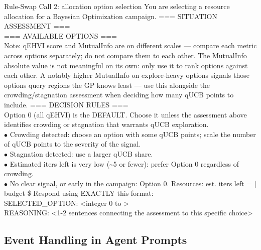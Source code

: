 \begin{fragmentbox}{Rule-Swap Call 2: allocation option selection}
\promptfont
You are selecting a resource allocation for a Bayesian Optimization campaign.
\vspace{0.35em}
=== SITUATION ASSESSMENT ===\\
\vspace{0.35em}
=== AVAILABLE OPTIONS ===\\
\vspace{0.35em}
Note: qEHVI score and MutualInfo are on different scales --- compare each metric
across options separately; do not compare them to each other. The MutualInfo absolute
value is not meaningful on its own: only use it to rank options against each other. A
notably higher MutualInfo on explore-heavy options signals those options query regions
the GP knows least --- use this alongside the crowding/stagnation assessment when
deciding how many qUCB points to include.
\vspace{0.35em}
=== DECISION RULES ===\\
Option 0 (all qEHVI) is the DEFAULT. Choose it unless the assessment above identifies
crowding or stagnation that warrants qUCB exploration.\\
\hspace*{1em}$\bullet$ Crowding detected: choose an option with some qUCB points; scale the number of qUCB points to the severity of the signal.\\
\hspace*{1em}$\bullet$ Stagnation detected: use a larger qUCB share.\\
\hspace*{1em}$\bullet$ Estimated iters left is very low (\~{}5 or fewer): prefer Option 0 regardless of crowding.\\
\hspace*{1em}$\bullet$ No clear signal, or early in the campaign: Option 0.
\vspace{0.35em}
Resources: est. iters left =  | budget \$
\vspace{0.35em}
Respond using EXACTLY this format:\\
SELECTED\_OPTION: <integer 0 to >\\
REASONING: <1-2 sentences connecting the assessment to this specific choice>
\end{fragmentbox}

\subsection{Event Handling in Agent Prompts}
\label{app:prompts_events}

